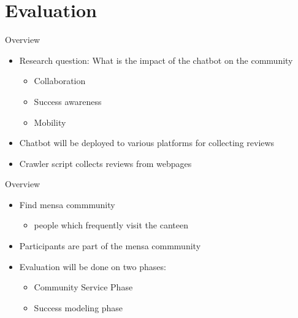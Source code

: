 \section{Evaluation}


\begin{frame}{Overview}
  \begin{itemize}
    \item Research question: What is the impact of the chatbot on the community
          \begin{itemize}
            \item Collaboration
            \item Success awareness
            \item Mobility
          \end{itemize}
    \item Chatbot will be deployed to various platforms for collecting reviews
    \item Crawler script collects reviews from webpages
  \end{itemize}
\end{frame}

\begin{frame}{Overview}
  \begin{itemize}
    \item Find mensa commmunity
          \begin{itemize}
            \item people which frequently visit the canteen
          \end{itemize}
    \item Participants are part of the mensa commmunity
    \item Evaluation will be done on two phases:
          \begin{itemize}
            \item  Community Service Phase
            \item Success modeling phase
          \end{itemize}
  \end{itemize}
\end{frame}


